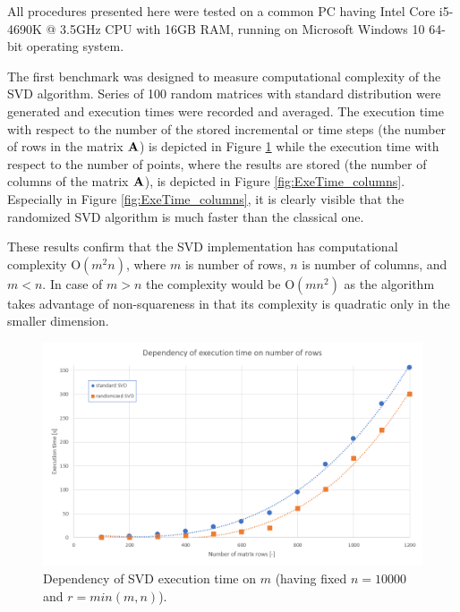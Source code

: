 All procedures presented here were tested on a common PC having Intel Core i5-4690K @ 3.5GHz CPU with 16GB RAM, running on Microsoft Windows 10 64-bit operating system.

The first benchmark was designed to measure computational complexity of the SVD algorithm. Series of 100 random matrices with standard distribution were generated and execution times were recorded and averaged. The execution time with respect to the number of the stored incremental or time steps (the number of rows in the matrix $\mathbf{A}$) is depicted in Figure \ref{fig:ExeTime_rows} while the execution time with respect to the number of points, where the results are stored (the number of columns of the matrix $\mathbf{A}$), is depicted in Figure \ref{fig:ExeTime_columns}. Especially in Figure \ref{fig:ExeTime_columns}, it is clearly visible that the randomized SVD algorithm is much faster than the classical one.

These results confirm that the SVD implementation has computational complexity $\mathrm{O}(m^2n)$, where $m$ is number of rows, $n$ is number of columns, and $m < n$. In case of $m > n$ the complexity would be $\mathrm{O}(mn^2)$ as the algorithm takes advantage of non-squareness in that its complexity is quadratic only in the smaller dimension.

\begin{figure}[H]
\centering
\includegraphics[width=\textwidth]{figures/chapter-SVD/executionTime_varyingRows}
\decoRule
\caption{Dependency of SVD execution time on $m$ (having fixed $n = 10000$ and $r=min(m,n)$).}
\label{fig:ExeTime_rows}
\end{figure}

